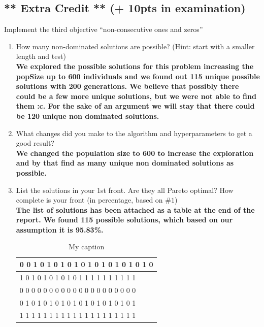 \documentclass[11pt, a4paper]{article}
\begin{document}
\newpage
\subsection{** Extra Credit ** (+ 10pts in examination)}
Implement the third objective ``non-consecutive ones and zeros''
\begin{enumerate}
	\item How many non-dominated solutions are possible? (Hint: start with a smaller length and test)\\
	\textbf{We explored the possible solutions for this problem increasing the popSize up to 600 individuals and we found out 115 unique possible solutions with 200 generations. We believe that possibly there could be a few more unique solutions, but we were not able to find them :c. For the sake of an argument we will stay that there could be 120 unique non dominated solutions.}
	\item What changes did you make to the algorithm and hyperparameters to get a good result?\\
	\textbf{ We changed the population size to 600 to increase the exploration and by that find as many unique non dominated solutions as possible.}
	\item List the solutions in your 1st front. Are they all Pareto optimal? How complete is your front (in percentage, based on $\#1$)\\
	\textbf{The list of solutions has been attached as a table at the end of the report. We found 115 possible solutions, which based on our assumption it is 95.83\%.}
	\begin{table}[http]
		\centering
		\caption{My caption}
		\label{my-label}
		\begin{tabular}{|l|}
			\hline
			0     0     1     0     1     0     1     0     1     0     1     0     1     0     1     0     1     0     1     0 \\ \hline
			1     0     1     0     1     0     1     0     1     0     1     1     1     1     1     1     1     1     1     1 \\ \hline
			0     0     0     0     0     0     0     0     0     0     0     0     0     0     0     0     0     0     0     0 \\ \hline
			0     1     0     1     0     1     0     1     0     1     0     1     0     1     0     1     0     1     0     1 \\ \hline
			1     1     1     1     1     1     1     1     1     1     1     1     1     1     1     1     1     1     1     1 \\ \hline

\end{tabular}
\end{table}
\end{enumerate}
\end{document}
